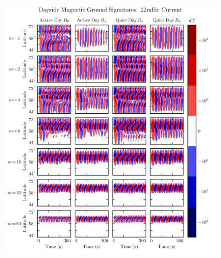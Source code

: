 \begin{figure}[!htb]
    \centering
    \includegraphics[width=\textwidth]{figures/ground_day.pdf}
    \caption[Dayside Ground Magnetic Fields]{
      \todo{$\cdots$}
    }
    \label{fig_ground_day}
\end{figure}

